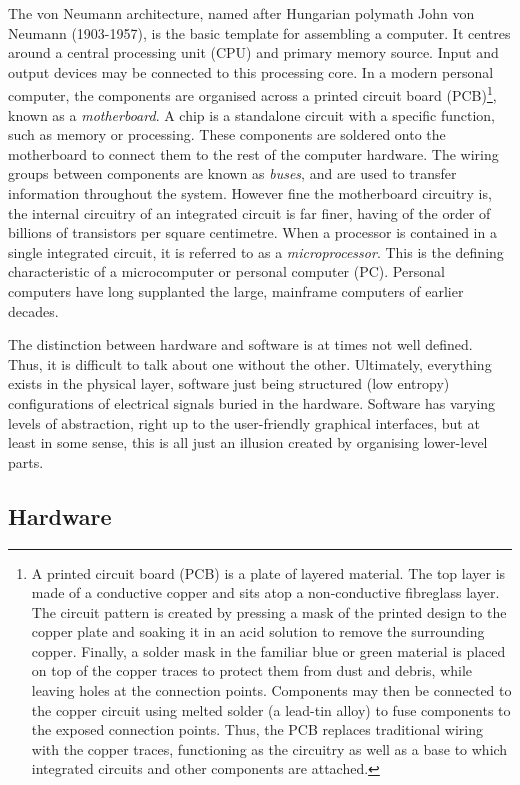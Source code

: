 \documentclass[11pt]{amsart}
\begin{document}
The von Neumann architecture, named after Hungarian polymath John von Neumann (1903-1957), is the basic template for assembling a computer. It centres around a central processing unit (CPU) and primary memory source. Input and output devices may be connected to this processing core. In a modern personal computer, the components are organised across a printed circuit board (PCB)\footnote{A printed circuit board (PCB) is a plate of layered material. The top layer is made of a conductive copper and sits atop a non-conductive fibreglass layer. The circuit pattern is created by pressing a mask of the printed design to the copper plate and soaking it in an acid solution to remove the surrounding copper. Finally, a solder mask in the familiar blue or green material is placed on top of the copper traces to protect them from dust and debris, while leaving holes at the connection points. Components may then be connected to the copper circuit using melted solder (a lead-tin alloy) to fuse components to the exposed connection points. Thus, the PCB replaces traditional wiring with the copper traces, functioning as the circuitry as well as a base to which integrated circuits and other components are attached.}, known as a \emph{motherboard}. A chip is a standalone circuit with a specific function, such as memory or processing. These components are soldered onto the motherboard to connect them to the rest of the computer hardware. The wiring groups between components are known as \emph{buses}, and are used to transfer information throughout the system. However fine the motherboard circuitry is, the internal circuitry of an integrated circuit is far finer, having of the order of billions of transistors per square centimetre. When a processor is contained in a single integrated circuit, it is referred to as a \emph{microprocessor}. This is the defining characteristic of a microcomputer or personal computer (PC). Personal computers have long supplanted the large, mainframe computers of earlier decades.

The distinction between hardware and software is at times not well defined. Thus, it is difficult to talk about one without the other. Ultimately, everything exists in the physical layer, software just being structured (low entropy) configurations of electrical signals buried in the hardware. Software has varying levels of abstraction, right up to the user-friendly graphical interfaces, but at least in some sense, this is all just an illusion created by organising lower-level parts.

\subsection{Hardware}
\end{document}
